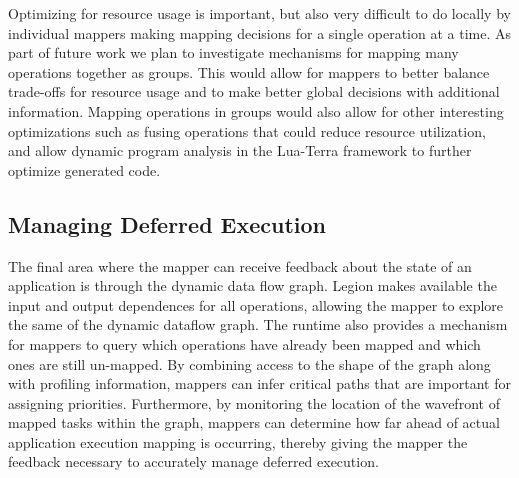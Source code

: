 Optimizing for resource usage is important, but also
very difficult to do locally by individual mappers
making mapping decisions for a single operation at
a time. As part of future work we plan to investigate
mechanisms for mapping many operations together as
groups. This would allow for mappers to better balance
trade-offs for resource usage and to make better
global decisions with additional information. Mapping
operations in groups would also allow for other 
interesting optimizations such as fusing operations that 
could reduce resource utilization, and allow dynamic program
analysis in the Lua-Terra framework to further optimize
generated code.

\subsection{Managing Deferred Execution}
\label{subsec:mappingdeferred}
The final area where the mapper can receive feedback
about the state of an application is through the 
dynamic data flow graph. Legion makes available the 
input and output dependences for all operations,
allowing the mapper to explore the same of the
dynamic dataflow graph. The runtime also provides a
mechanism for mappers to query which operations have
already been mapped and which ones are still 
un-mapped.  By combining access to the shape of the
graph along with profiling information, mappers can
infer critical paths that are important for assigning
priorities. Furthermore, by monitoring the location
of the wavefront of mapped tasks within the graph,
mappers can determine how far ahead of actual
application execution mapping is occurring, thereby
giving the mapper the feedback necessary to 
accurately manage deferred execution.


